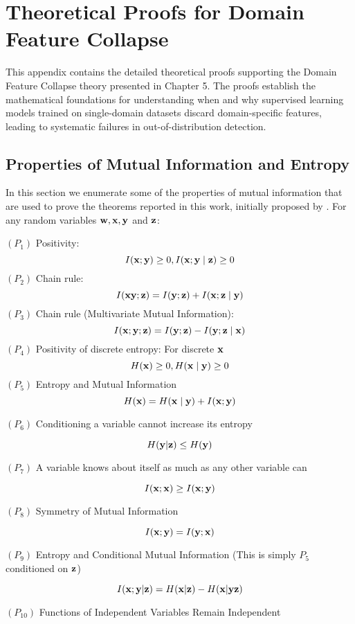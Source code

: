 \chapter{Theoretical Proofs for Domain Feature Collapse}
\label{app:domain_proofs}

This appendix contains the detailed theoretical proofs supporting the Domain Feature Collapse theory presented in Chapter 5. The proofs establish the mathematical foundations for understanding when and why supervised learning models trained on single-domain datasets discard domain-specific features, leading to systematic failures in out-of-distribution detection.

\section{Properties of Mutual Information and Entropy}
\label{app:domain_properties}

In this section we enumerate some of the properties of mutual information that are used to prove the theorems reported in this work, initially proposed by \cite{shannon1948mathematical}. For any random variables ${\mathbf{w}}, {\mathbf{x}}, {\mathbf{y}}$ and ${\mathbf{z}}$:

$\left(P_1\right)$ Positivity:
$$
I({\mathbf{x}} ; {\mathbf{y}}) \geq 0, I({\mathbf{x}} ; {\mathbf{y}} \mid {\mathbf{z}}) \geq 0
$$
$\left(P_2\right)$ Chain rule:
$$
I({\mathbf{x}} {\mathbf{y}} ; {\mathbf{z}})=I({\mathbf{y}} ; {\mathbf{z}})+I({\mathbf{x}} ; {\mathbf{z}} \mid {\mathbf{y}})
$$
$\left(P_3\right)$ Chain rule (Multivariate Mutual Information):
$$
I({\mathbf{x}} ; {\mathbf{y}} ; {\mathbf{z}})=I({\mathbf{y}} ; {\mathbf{z}})-I({\mathbf{y}} ; {\mathbf{z}} \mid {\mathbf{x}})
$$
$\left(P_4\right)$ Positivity of discrete entropy:
For discrete ${\mathbf{x}}$
$$
H({\mathbf{x}}) \geq 0, H({\mathbf{x}} \mid {\mathbf{y}}) \geq 0
$$
$\left(P_5\right)$ Entropy and Mutual Information
$$
H({\mathbf{x}})=H({\mathbf{x}} \mid {\mathbf{y}})+I({\mathbf{x}} ; {\mathbf{y}})
$$

$(P_6)$ Conditioning a variable cannot increase its entropy

$$
H({\mathbf{y}}|{\mathbf{z}}) \leq H({\mathbf{y}})
$$

$(P_7)$ A variable knows about itself as much as any other variable can 

$$
I({\mathbf{x}};{\mathbf{x}}) \geq I({\mathbf{x}};{\mathbf{y}}) 
$$

$(P_8)$ Symmetry of Mutual Information

$$
I({\mathbf{x}};{\mathbf{y}}) = I({\mathbf{y}};{\mathbf{x}}) 
$$

$(P_9)$ Entropy and Conditional Mutual Information (This is simply $P_5$ conditioned on ${\mathbf{z}}$)

$$
I({\mathbf{x}};{\mathbf{y}}|{\mathbf{z}})  = H({\mathbf{x}}|{\mathbf{z}}) - H({\mathbf{x}}|{\mathbf{y}}{\mathbf{z}})
$$

$(P_{10})$ Functions of Independent Variables Remain Independent

